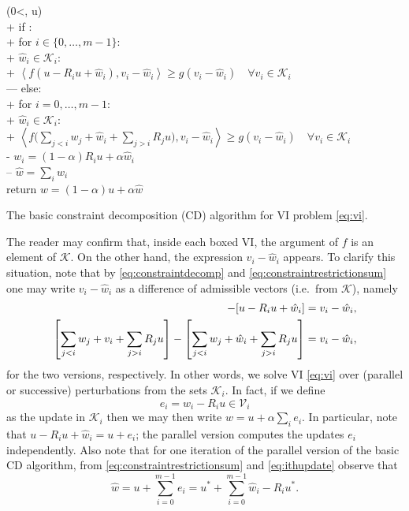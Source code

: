 \documentclass[letterpaper,final,12pt,reqno]{amsart}
\theoremstyle{cstyle}
\theoremstyle{cstyle*}
\theoremstyle{dstyle}
\numberwithin{equation}{section}
\numberwithin{figure}{section}
\numberwithin{table}{section}
\numberwithin{theorem}{section}
\newcommand{\cK}{\mathcal{K}}
\newcommand{\cV}{\mathcal{V}}
\newcommand{\ip}[2]{\left<#1,#2\right>}
\begin{document}
\begin{pseudofloat}[H]
\begin{pseudo*}
(0<\alpha{}, u\in\cK)\text{:} \\+
    if : \\+
        for $i \in \{0,\dots,m-1\}$: \\+
            $\hat w_i\in \cK_i$: \\+
                 $\boxed{\ip{f(u - R_i u + \hat w_i)}{v_i-\hat w_i} \ge g(v_i-\hat w_i)} \quad \forall v_i\in \cK_i$ \\---
    else: \\+
        for $i = 0,\dots,m-1$: \\+
            $\hat w_i\in \cK_i$: \\+
                $\displaystyle \boxed{\ip{f\Big(\sum_{j<i} w_j + \hat w_i + \sum_{j>i} R_j u\Big)}{v_i-\hat w_i} \ge g(v_i-\hat w_i)} \quad \forall v_i\in \cK_i$ \\-
            $w_i = (1-\alpha) R_i u + \alpha \hat w_i$ \\--
    $\hat w = \sum_i \hat w_i$ \\
    return $w=(1-\alpha) u + \alpha \hat w$
\end{pseudo*}
\caption{The basic constraint decomposition (CD) algorithm for VI problem \eqref{eq:vi}.}
\label{alg:basiccd}
\end{pseudofloat}

The reader may confirm that, inside each boxed VI, the argument of $f$ is an element of $\cK$.  On the other hand, the expression $v_i - \hat w_i$ appears.  To clarify this situation, note that by \eqref{eq:constraintdecomp} and \eqref{eq:constraintrestrictionsum} one may write $v_i - \hat w_i$ as a difference of admissible vectors (i.e.~from $\cK$), namely
\begin{align*}
[u - R_i u + v_i] - [u - R_i u + \hat w_i] &= v_i - \hat w_i, \label{eq:admissibledifference} \\
\left[\sum_{j<i} w_j + v_i + \sum_{j>i} R_j u\right] - \left[\sum_{j<i} w_j + \hat w_i + \sum_{j>i} R_j u\right] &= v_i - \hat w_i,  \notag
\end{align*}
for the two versions, respectively.  In other words, we solve VI \eqref{eq:vi} over (parallel or successive) perturbations from the sets $\cK_i$.  In fact, if we define
\begin{equation}
e_i = \hat w_i - R_i u \in \cV_i \label{eq:ithupdate}
\end{equation}
as the update in $\cK_i$ then we may then write $w = u + \alpha \sum_i e_i$.  In particular, note that $u - R_i u + \hat w_i = u + e_i$; the parallel version computes the updates $e_i$ independently.  Also note that for one iteration of the parallel version of the basic CD algorithm, from \eqref{eq:constraintrestrictionsum} and \eqref{eq:ithupdate} observe that
\begin{equation}
\hat w = u + \sum_{i=0}^{m-1} e_i = u^* + \sum_{i=0}^{m-1} \hat w_i - R_i u^*.  \label{eq:ithupdatefacts}
\end{equation}
\end{document}
